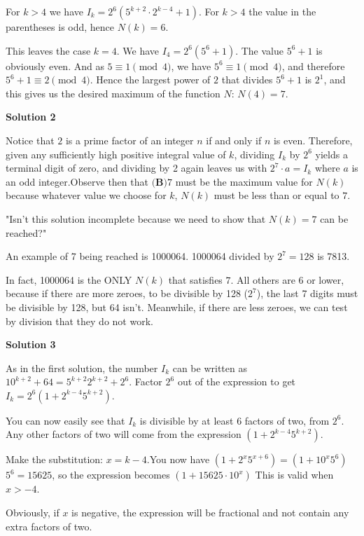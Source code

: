 \begin{enumerate}
 For $k>4$ we have $I_k=2^6 \left( 5^{k+2}\cdot 2^{k-4} + 1 \right)$. For $k>4$ the value in the parentheses is odd, hence $N(k)=6$.

 This leaves the case $k=4$. We have $I_4 = 2^6 \left( 5^6 + 1 \right)$. The value $5^6 + 1$ is obviously even. And as $5\equiv 1 \pmod 4$, we have $5^6 \equiv 1 \pmod 4$, and therefore $5^6 + 1 \equiv 2 \pmod 4$. Hence the largest power of $2$ that divides $5^6+1$ is $2^1$, and this gives us the desired maximum of the function $N$: $N(4) = \boxed{7}$.

 



\textbf{Solution 2}

Notice that $2$ is a prime factor of an integer $n$ if and only if $n$ is even. Therefore, given any sufficiently high positive integral value of $k$, dividing $I_k$ by $2^6$ yields a terminal digit of zero, and dividing by 2 again leaves us with $2^7 \cdot a = I_k$ where $a$ is an odd integer.Observe then that $\boxed{\textbf{(B)}7}$ must be the maximum value for $N(k)$ because whatever value we choose for $k$, $N(k)$ must be less than or equal to $7$.

 "Isn't this solution incomplete because we need to show that $N(k) = 7$ can be reached?"

 An example of 7 being reached is 1000064. 1000064 divided by $2^7=128$ is 7813.

 In fact, 1000064 is the ONLY $N(k)$ that satisfies $7$. All others are 6 or lower, because if there are more zeroes, to be divisible by 128 ($2^7$), the last 7 digits must be divisible by 128, but 64 isn't. Meanwhile, if there are less zeroes, we can test by division that they do not work.

 



\textbf{Solution 3}

As in the first solution, the number $I_k$ can be written as $10^{k+2} + 64 = 5^{k+2} 2^{k+2} + 2^6$. Factor $2^6$ out of the expression to get $I_k = 2^6(1+2^{k-4}5^{k+2})$.

 You can now easily see that $I_k$ is divisible by at least 6 factors of two, from $2^6$. Any other factors of two will come from the expression $(1+2^{k-4}5^{k+2})$. 

 Make the substitution: $x=k-4$.You now have $(1+2^{x}5^{x+6}) = (1+10^x 5^6)$
$5^6=15625$, so the expression becomes $(1+15625\cdot10^x)$ This is valid when $x>-4$. 

 Obviously, if $x$ is negative, the expression will be fractional and not contain any extra factors of two.


\end{enumerate}
